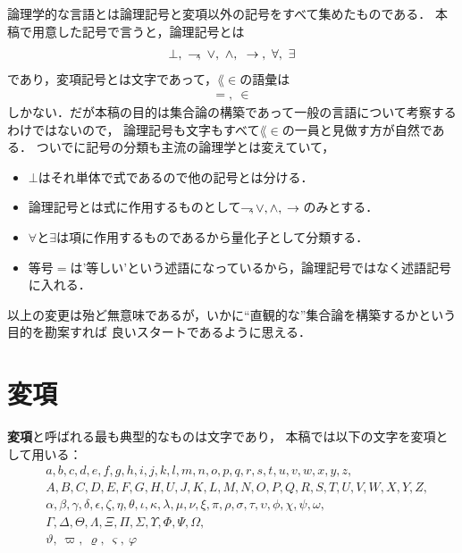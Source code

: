 	論理学的な言語とは論理記号と変項以外の記号をすべて集めたものである．
	本稿で用意した記号で言うと，論理記号とは
	\begin{align}
		\bot,\ \rightharpoondown\hspace{-0.25em},\ \vee,\ \wedge,\ \hspace{0.25em}\rightarrow\hspace{0.25em},\ \forall,\ \exists
	\end{align}
	であり，変項記号とは文字であって，$\lang{\in}$の語彙は
	\begin{align}
		=,\ \in
	\end{align}
	しかない．だが本稿の目的は集合論の構築であって一般の言語について考察するわけではないので，
	論理記号も文字もすべて$\lang{\in}$の一員と見做す方が自然である．
	ついでに記号の分類も主流の論理学とは変えていて，
	\begin{itemize}
		\item $\bot$はそれ単体で式であるので他の記号とは分ける．
		\item 論理記号とは式に作用するものとして$\rightharpoondown\hspace{-0.25em},\vee,\wedge,\hspace{0.25em}\rightarrow\hspace{0.25em}$のみとする．
		\item $\forall$と$\exists$は項に作用するものであるから量化子として分類する．
		\item 等号$=$は'等しい'という述語になっているから，論理記号ではなく述語記号に入れる．
	\end{itemize}
	以上の変更は殆ど無意味であるが，いかに``直観的な''集合論を構築するかという目的を勘案すれば
	良いスタートであるように思える．
	
\section{変項}
\label{sec:variables}
	{\bf 変項}と呼ばれる最も典型的なものは文字であり，
	本稿では以下の文字を変項として用いる：
	\begin{align}
		&a,b,c,d,e,f,g,h,i,j,k,l,m,n,o,p,q,r,s,t,u,v,w,x,y,z, \\
		&A,B,C,D,E,F,G,H,U,J,K,L,M,N,O,P,Q,R,S,T,U,V,W,X,Y,Z, \\
		&\alpha,\beta,\gamma,\delta,\epsilon,\zeta,\eta,\theta,\iota,
			\kappa,\lambda,\mu,\nu,\xi,\pi,\rho,\sigma,\tau,\upsilon,
			\phi,\chi,\psi,\omega, \\
		&\Gamma,\Delta,\Theta,\Lambda,\Xi,\Pi,\Sigma,\Upsilon,\Phi,\Psi,\Omega, \\
		&\vartheta,\ \varpi,\ \varrho,\ \varsigma,\ \varphi
	\end{align}
	
